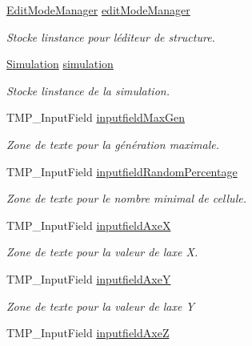 \begin{DoxyCompactItemize}
\item 
\mbox{\hyperlink{class_edit_mode_manager}{Edit\+Mode\+Manager}} \mbox{\hyperlink{class_parameters_ac7a257a7373d1889a8bdf4eca25e6574}{edit\+Mode\+Manager}}
\begin{DoxyCompactList}\small\item\em Stocke l\textquotesingle{}instance pour l\textquotesingle{}éditeur de structure. \end{DoxyCompactList}\item 
\mbox{\hyperlink{class_simulation}{Simulation}} \mbox{\hyperlink{class_parameters_ae0b748fde33ea353527d677ad10598dc}{simulation}}
\begin{DoxyCompactList}\small\item\em Stocke l\textquotesingle{}instance de la simulation. \end{DoxyCompactList}\item 
T\+M\+P\+\_\+\+Input\+Field \mbox{\hyperlink{class_parameters_a5dfd90d9127f6ac54d0fc72ce5aeaf89}{inputfield\+Max\+Gen}}
\begin{DoxyCompactList}\small\item\em Zone de texte pour la génération maximale. \end{DoxyCompactList}\item 
T\+M\+P\+\_\+\+Input\+Field \mbox{\hyperlink{class_parameters_a25554c9b16cf4851153f94ded0c9506a}{inputfield\+Random\+Percentage}}
\begin{DoxyCompactList}\small\item\em Zone de texte pour le nombre minimal de cellule. \end{DoxyCompactList}\item 
T\+M\+P\+\_\+\+Input\+Field \mbox{\hyperlink{class_parameters_a144f3907a5a97b677777c361e1732d87}{inputfield\+AxeX}}
\begin{DoxyCompactList}\small\item\em Zone de texte pour la valeur de l\textquotesingle{}axe X. \end{DoxyCompactList}\item 
T\+M\+P\+\_\+\+Input\+Field \mbox{\hyperlink{class_parameters_a7a8f81335eea4caef79b5b2aee17e473}{inputfield\+AxeY}}
\begin{DoxyCompactList}\small\item\em Zone de texte pour la valeur de l\textquotesingle{}axe Y \end{DoxyCompactList}\item 
T\+M\+P\+\_\+\+Input\+Field \mbox{\hyperlink{class_parameters_aa791b4cf0b210915f89c2d302a4e7512}{inputfield\+AxeZ}}

\end{DoxyCompactItemize}
